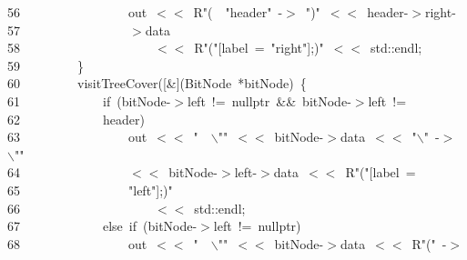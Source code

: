\documentclass[11pt,a4paper]{ctexart}
\newcommand{\hlstd}[1]{\textcolor[rgb]{0.2,0.2,0.2}{#1}}
\newcommand{\hlesc}[1]{\textcolor[rgb]{0.86,0.41,0.09}{#1}}
\newcommand{\hlstr}[1]{\textcolor[rgb]{0.06,0.58,0.63}{#1}}
\newcommand{\hlopt}[1]{\textcolor[rgb]{0.2,0.2,0.2}{#1}}
\newcommand{\hllin}[1]{\textcolor[rgb]{0.59,0.59,0.59}{#1}}
\newcommand{\hlkwa}[1]{\textcolor[rgb]{0.23,0.42,0.78}{#1}}
\newcommand{\hlkwc}[1]{\textcolor[rgb]{0,0.63,0.31}{#1}}
\newcommand{\hlkwd}[1]{\textcolor[rgb]{0.78,0.23,0.41}{#1}}
\begin{document}
\hllin{56\ }\hlstd{}\hlstd{\ \ \ \ \ \ \ \ \ \ \ \ \ \ \ \ }\hlstd{out\ }\hlopt{$<$$<$\ }\hlstd{R}\hlstr{"(}\hlstd{\ \ }\hlstr{"}\hlstd{header}\hlstr{"\ {-}$>$\ "}\hlstd{}\hlopt{)}\hlstd{}\hlstr{"\ $<$$<$\ header{-}$>$right{-}}\Righttorque\\
\hllin{57\ }\hlstr{}\hlstd{\ \ \ \ \ \ \ \ \ \ \ \ \ \ \ \ }\hlstr{$>$data}\\
\hllin{58\ }\hlstr{}\hlstd{\ \ \ \ \ \ \ \ \ \ \ \ \ \ \ \ \ \ \ \ }\hlstr{$<$$<$\ R"}\hlstd{}\hlopt{(}\hlstd{}\hlstr{"{[}label\ =\ "}\hlstd{right}\hlstr{"{]};)"}\hlstd{\ }\hlopt{$<$$<$\ }\hlstd{}\hlkwc{std}\hlstd{}\hlopt{::}\hlstd{endl}\hlopt{;}\\
\hllin{59\ }\hlstd{}\hlstd{\ \ \ \ \ \ \ \ }\hlstd{}\hlopt{\}}\\
\hllin{60\ }\hlstd{}\hlstd{\ \ \ \ \ \ \ \ }\hlstd{}\hlkwd{visitTreeCover}\hlstd{}\hlopt{({[}\&{]}(}\hlstd{BitNode\ }\hlopt{{*}}\hlstd{bitNode}\hlopt{)\ \{}\\
\hllin{61\ }\hlstd{}\hlstd{\ \ \ \ \ \ \ \ \ \ \ \ }\hlstd{}\hlkwa{if\ }\hlstd{}\hlopt{(}\hlstd{bitNode}\hlopt{{-}$>$}\hlstd{left\ }\hlopt{!=\ }\hlstd{}\hlkwc{nullptr\ }\hlstd{}\hlopt{\&\&\ }\hlstd{bitNode}\hlopt{{-}$>$}\hlstd{left\ }\hlopt{!=\ }\Righttorque\\
\hllin{62\ }\hlstd{}\hlstd{\ \ \ \ \ \ \ \ \ \ \ \ }\hlstd{header}\hlopt{)}\\
\hllin{63\ }\hlstd{}\hlstd{\ \ \ \ \ \ \ \ \ \ \ \ \ \ \ \ }\hlstd{out\ }\hlopt{$<$$<$\ }\hlstd{}\hlstr{"}\hlstd{\ \ }\hlstr{}\hlesc{$\backslash$"}\hlstr{"}\hlstd{\ }\hlopt{$<$$<$\ }\hlstd{bitNode}\hlopt{{-}$>$}\hlstd{data\ }\hlopt{$<$$<$\ }\hlstd{}\hlstr{"}\hlesc{$\backslash$"\ }\hlstr{{-}$>$\ }\hlesc{$\backslash$"}\hlstr{"}\hlstd{\ }\Righttorque\\
\hllin{64\ }\hlstd{}\hlstd{\ \ \ \ \ \ \ \ \ \ \ \ \ \ \ \ }\hlstd{}\hlopt{$<$$<$\ }\hlstd{bitNode}\hlopt{{-}$>$}\hlstd{left}\hlopt{{-}$>$}\hlstd{data\ }\hlopt{$<$$<$\ }\hlstd{R}\hlstr{"("}\hlstd{}\hlopt{{[}}\hlstd{label\ }\hlopt{=\ }\Righttorque\\
\hllin{65\ }\hlstd{}\hlstd{\ \ \ \ \ \ \ \ \ \ \ \ \ \ \ \ }\hlstd{}\hlstr{"left"}\hlstd{}\hlopt{{]};)}\hlstd{}\hlstr{"}\\
\hllin{66\ }\hlstr{}\hlstd{\ \ \ \ \ \ \ \ \ \ \ \ \ \ \ \ \ \ \ \ }\hlstr{$<$$<$\ std::endl;}\\
\hllin{67\ }\hlstr{}\hlstd{\ \ \ \ \ \ \ \ \ \ \ \ }\hlstr{else\ if\ (bitNode{-}$>$left\ !=\ nullptr)}\\
\hllin{68\ }\hlstr{}\hlstd{\ \ \ \ \ \ \ \ \ \ \ \ \ \ \ \ }\hlstr{out\ $<$$<$\ "}\hlstd{}\hlstd{\ \ }\hlstd{}\hlesc{$\backslash$"}\hlstd{}\hlstr{"\ $<$$<$\ bitNode{-}$>$data\ $<$$<$\ R"}\hlstd{}\hlopt{(}\hlstd{}\hlstr{"\ {-}$>$\ }\Righttorque\\
\end{document}
